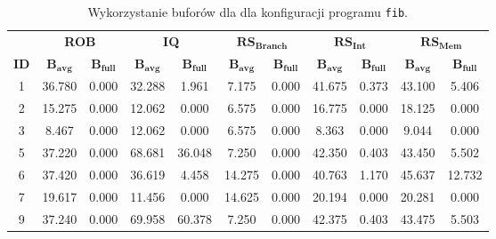 \begin{table}[]
\centering
\caption{ Wykorzystanie buforów dla dla konfiguracji programu \texttt{fib}. }
\label{tab:buffers_fib}
\begin{tabular}{|c|cc|cc|cc|cc|cc|}
\hline& \multicolumn{2}{c|}{\textbf{ROB}} & \multicolumn{2}{c|}{\textbf{IQ}} & \multicolumn{2}{c|}{$\mathbf{RS_{Branch}}$} & \multicolumn{2}{c|}{$\mathbf{RS_{Int}}$} & \multicolumn{2}{c|}{$\mathbf{RS_{Mem}}$} \\ \cline{2-11}
\multirow{-2}{*}{\cellcolor[HTML]{EFEFEF}\textbf{ID}} & $\mathbf{B_{avg}}$ & \cellcolor[HTML]{EFEFEF}$\mathbf{B_{full}}$ & $\mathbf{B_{avg}}$ & \cellcolor[HTML]{EFEFEF}$\mathbf{B_{full}}$ & $\mathbf{B_{avg}}$ & \cellcolor[HTML]{EFEFEF}$\mathbf{B_{full}}$ & $\mathbf{B_{avg}}$ & \cellcolor[HTML]{EFEFEF}$\mathbf{B_{full}}$ & $\mathbf{B_{avg}}$ & \cellcolor[HTML]{EFEFEF}$\mathbf{B_{full}}$ \\ \hline
1 & 36.780 & \cellcolor[HTML]{EFEFEF}0.000 & 32.288 & \cellcolor[HTML]{EFEFEF}1.961 & 7.175 & \cellcolor[HTML]{EFEFEF}0.000 & 41.675 & \cellcolor[HTML]{EFEFEF}0.373 & 43.100 & \cellcolor[HTML]{EFEFEF}5.406 \\ \hline
2 & 15.275 & \cellcolor[HTML]{EFEFEF}0.000 & 12.062 & \cellcolor[HTML]{EFEFEF}0.000 & 6.575 & \cellcolor[HTML]{EFEFEF}0.000 & 16.775 & \cellcolor[HTML]{EFEFEF}0.000 & 18.125 & \cellcolor[HTML]{EFEFEF}0.000 \\ \hline
3 & 8.467 & \cellcolor[HTML]{EFEFEF}0.000 & 12.062 & \cellcolor[HTML]{EFEFEF}0.000 & 6.575 & \cellcolor[HTML]{EFEFEF}0.000 & 8.363 & \cellcolor[HTML]{EFEFEF}0.000 & 9.044 & \cellcolor[HTML]{EFEFEF}0.000 \\ \hline
5 & 37.220 & \cellcolor[HTML]{EFEFEF}0.000 & 68.681 & \cellcolor[HTML]{EFEFEF}36.048 & 7.250 & \cellcolor[HTML]{EFEFEF}0.000 & 42.350 & \cellcolor[HTML]{EFEFEF}0.403 & 43.450 & \cellcolor[HTML]{EFEFEF}5.502 \\ \hline
6 & 37.420 & \cellcolor[HTML]{EFEFEF}0.000 & 36.619 & \cellcolor[HTML]{EFEFEF}4.458 & 14.275 & \cellcolor[HTML]{EFEFEF}0.000 & 40.763 & \cellcolor[HTML]{EFEFEF}1.170 & 45.637 & \cellcolor[HTML]{EFEFEF}12.732 \\ \hline
7 & 19.617 & \cellcolor[HTML]{EFEFEF}0.000 & 11.456 & \cellcolor[HTML]{EFEFEF}0.000 & 14.625 & \cellcolor[HTML]{EFEFEF}0.000 & 20.194 & \cellcolor[HTML]{EFEFEF}0.000 & 20.281 & \cellcolor[HTML]{EFEFEF}0.000 \\ \hline
9 & 37.240 & \cellcolor[HTML]{EFEFEF}0.000 & 69.958 & \cellcolor[HTML]{EFEFEF}60.378 & 7.250 & \cellcolor[HTML]{EFEFEF}0.000 & 42.375 & \cellcolor[HTML]{EFEFEF}0.403 & 43.475 & \cellcolor[HTML]{EFEFEF}5.503 \\ \hline

\end{tabular}
\end{table}
